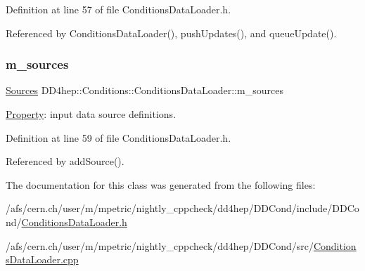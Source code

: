 Definition at line 57 of file Conditions\+Data\+Loader.\+h.



Referenced by Conditions\+Data\+Loader(), push\+Updates(), and queue\+Update().

\hypertarget{class_d_d4hep_1_1_conditions_1_1_conditions_data_loader_a1f27d2cb0eb76ecfb39322fb08343b31}{}\label{class_d_d4hep_1_1_conditions_1_1_conditions_data_loader_a1f27d2cb0eb76ecfb39322fb08343b31} 
\subsubsection{\texorpdfstring{m\+\_\+sources}{m\_sources}}
{\footnotesize\ttfamily \hyperlink{class_d_d4hep_1_1_conditions_1_1_conditions_data_loader_a10469a47fdf0b7949194f79c35ee9510}{Sources} D\+D4hep\+::\+Conditions\+::\+Conditions\+Data\+Loader\+::m\+\_\+sources\hspace{0.3cm}{\ttfamily [protected]}}



\hyperlink{class_d_d4hep_1_1_property}{Property}\+: input data source definitions. 



Definition at line 59 of file Conditions\+Data\+Loader.\+h.



Referenced by add\+Source().



The documentation for this class was generated from the following files\+:\begin{DoxyCompactItemize}
\item 
/afs/cern.\+ch/user/m/mpetric/nightly\+\_\+cppcheck/dd4hep/\+D\+D\+Cond/include/\+D\+D\+Cond/\hyperlink{_conditions_data_loader_8h}{Conditions\+Data\+Loader.\+h}\item 
/afs/cern.\+ch/user/m/mpetric/nightly\+\_\+cppcheck/dd4hep/\+D\+D\+Cond/src/\hyperlink{_conditions_data_loader_8cpp}{Conditions\+Data\+Loader.\+cpp}\end{DoxyCompactItemize}
